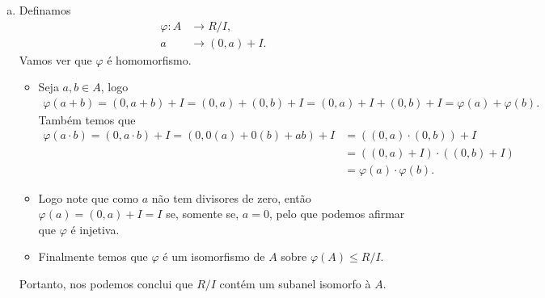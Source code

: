 \begin{homeworkProblem}[14]
\begin{solution}
\begin{enumerate}[a)]
\begin{align*}
      \end{align*}
      Assim $I$ também é ideal a esquerda y portanto temos que $I$ é um ideal de $R$.
    \item Definamos
      \begin{align*}
        \varphi:A&\to R/I,\\
                a&\to (0,a)+I.
      \end{align*}
      Vamos ver que $\varphi$ é homomorfismo.
      \begin{itemize}
        \item Seja $a,b\in A$, logo
          \begin{align*}
            \varphi(a+b)=(0,a+b)+I=(0,a)+(0,b)+I=(0,a)+I+(0,b)+I=\varphi(a)+\varphi(b).
          \end{align*}
          Também temos que
          \begin{align*}
            \varphi(a\cdot b)=(0,a\cdot b)+I=(0,0(a)+0(b)+ab)+I&=((0,a)\cdot (0,b))+I\\
            &=((0,a)+I)\cdot((0,b)+I)\\
            &=\varphi(a)\cdot\varphi(b).
          \end{align*}
        \item Logo note que como $a$ não tem divisores de zero, então $\varphi(a)=(0,a)+I=I$ se, somente se, $a=0$, pelo que podemos afirmar que $\varphi$ é injetiva.
        \item Finalmente temos que $\varphi$ é um isomorfismo de $A$ sobre $\varphi(A)\leq R/I$. 
      \end{itemize}
      Portanto, nos podemos conclui que $R/I$ contém um subanel isomorfo à $A$. 
  \end{enumerate}
  \end{solution}
\end{homeworkProblem}
